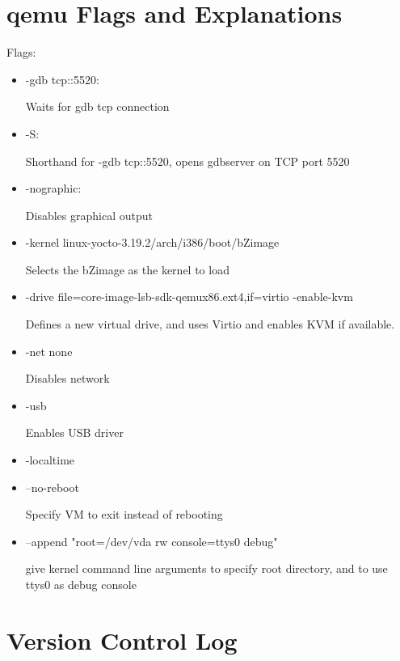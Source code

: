 \documentclass[onecolumn, draftclsnofoot,10pt, compsoc]{IEEEtran}
\begin{document}
\section{qemu Flags and Explanations}
Flags:
\begin{itemize}
    \item -gdb tcp::5520:
    
        Waits for gdb tcp connection
    \item -S:
    
        Shorthand for -gdb tcp::5520, opens gdbserver on TCP port 5520
    \item -nographic:
    
        Disables graphical output
    \item -kernel linux-yocto-3.19.2/arch/i386/boot/bZimage
    
        Selects the bZimage as the kernel to load
    \item -drive file=core-image-lsb-sdk-qemux86.ext4,if=virtio -enable-kvm
    
        Defines a new virtual drive, and uses Virtio and enables KVM if available.
    \item -net none
    
        Disables network
    \item -usb
    
        Enables USB driver
    \item -localtime
    
    \item --no-reboot
    
        Specify VM to exit instead of rebooting
    \item --append "root=/dev/vda rw console=ttys0 debug"
    
        give kernel command line arguments to specify root directory, and to use ttys0 as debug console
\end{itemize}

\newpage
\section{Version Control Log}

\end{document}
